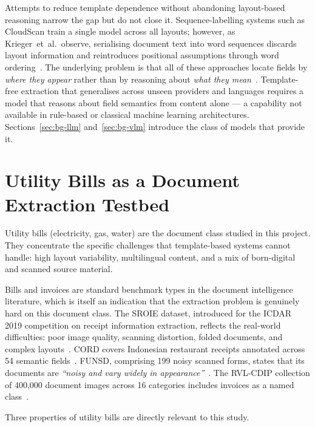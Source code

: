 Attempts to reduce template dependence without abandoning layout-based
reasoning narrow the gap but do not close it.
Sequence-labelling systems such as CloudScan train a single model
across all layouts; however, as Krieger~et~al.\ observe, serialising
document text into word sequences discards layout information and
reintroduces positional assumptions through word
ordering~\cite{Krieger2021GNN}.
The underlying problem is that all of these approaches locate fields
by \textit{where they appear} rather than by reasoning about
\textit{what they mean}~\cite{Holt2018Invoices}.
Template-free extraction that generalises across unseen providers and
languages requires a model that reasons about field semantics from
content alone --- a capability not available in rule-based or
classical machine learning architectures.
Sections~\ref{sec:bg-llm} and~\ref{sec:bg-vlm} introduce the class of
models that provide it.
 
\section{Utility Bills as a Document Extraction Testbed}
\label{sec:bg-utilitybills}
 
Utility bills (electricity, gas, water) are the document class studied
in this project.
They concentrate the specific challenges that template-based systems
cannot handle: high layout variability, multilingual content, and a
mix of born-digital and scanned source material.
 
Bills and invoices are standard benchmark types in the document
intelligence literature, which is itself an indication that the
extraction problem is genuinely hard on this document class.
The SROIE dataset, introduced for the ICDAR 2019 competition on receipt
information extraction, reflects the real-world difficulties: poor
image quality, scanning distortion, folded documents, and complex
layouts~\cite{Huang2019SROIE}.
CORD covers Indonesian restaurant receipts annotated across 54 semantic
fields~\cite{Park2019CORD}.
FUNSD, comprising 199 noisy scanned forms, states that its documents
are \textit{``noisy and vary widely in
appearance''}~\cite{Jaume2019FUNSD}.
The RVL-CDIP collection of 400,000 document images across 16 categories
includes invoices as a named class~\cite{Harley2015RVLCDIP}.
 
Three properties of utility bills are directly relevant to this study.

